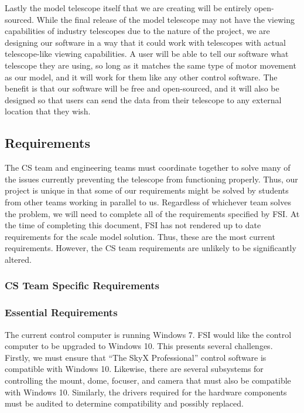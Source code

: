 \documentclass[12pt]{report}
\begin{document}
Lastly the model telescope itself that we are creating will be entirely open-sourced. While the final release of the model telescope may not have the viewing capabilities of industry telescopes due to the nature of the project, we are designing our software in a way that it could work with telescopes with actual telescope-like viewing capabilities. A user will be able to tell our software what telescope they are using, so long as it matches the same type of motor movement as our model, and it will work for them like any other control software. The benefit is that our software will be free and open-sourced, and it will also be designed so that users can send the data from their telescope to any external location that they wish.

\subsection*{Requirements}

The CS team and engineering teams must coordinate together to solve many of the issues currently preventing the telescope from functioning properly. Thus, our project is unique in that some of our requirements might be solved by students from other teams working in parallel to us. Regardless of whichever team solves the problem, we will need to complete all of the requirements specified by FSI.
At the time of completing this document, FSI has not rendered up to date requirements for the scale model solution. Thus, these are the most current requirements. However, the CS team requirements are unlikely to be significantly altered.

\subsubsection*{CS Team Specific Requirements}

\subsubsection*{Essential Requirements}

The current control computer is running Windows 7. FSI would like the control computer to be upgraded to Windows 10. This presents several challenges. Firstly, we must ensure that “The SkyX Professional” control software is compatible with Windows 10. Likewise, there are several subsystems for controlling the mount, dome, focuser, and camera that must also be compatible with Windows 10. Similarly, the drivers required for the hardware components must be audited to determine compatibility and possibly replaced.
\end{document}
